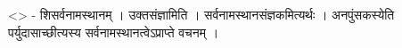 \textless{}\textgreater{} - शिसर्वनामस्थानम् । उक्तसंज्ञामिति ।
सर्वनामस्थानसंज्ञकमित्यर्थः । अनपुंसकस्येति पर्युदासाच्छीत्यस्य
सर्वनामस्थानत्वेऽप्राप्ते वचनम् ।
